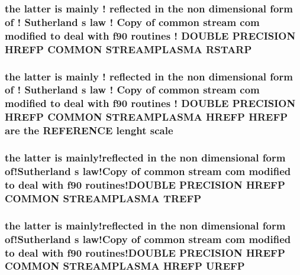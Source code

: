 \hypertarget{streamplasma_8com_adae9419de6845ee8a01c09d17e42e230}{
\subsubsection[{R\-S\-T\-A\-R\-P}]{\setlength{\rightskip}{0pt plus 5cm}the latter is mainly ! reflected in the non dimensional form of ! Sutherland s law ! Copy of common stream com modified to deal with f90 routines ! D\-O\-U\-B\-L\-E P\-R\-E\-C\-I\-S\-I\-O\-N H\-R\-E\-F\-P C\-O\-M\-M\-O\-N S\-T\-R\-E\-A\-M\-P\-L\-A\-S\-M\-A R\-S\-T\-A\-R\-P}}\label{streamplasma_8com_adae9419de6845ee8a01c09d17e42e230}
\hypertarget{streamplasma_8com_a9616e932993fe637ff56a4e7e73a4edd}{
\subsubsection[{scale}]{\setlength{\rightskip}{0pt plus 5cm}the latter is mainly ! reflected in the non dimensional form of ! Sutherland s law ! Copy of common stream com modified to deal with f90 routines ! D\-O\-U\-B\-L\-E P\-R\-E\-C\-I\-S\-I\-O\-N H\-R\-E\-F\-P C\-O\-M\-M\-O\-N S\-T\-R\-E\-A\-M\-P\-L\-A\-S\-M\-A H\-R\-E\-F\-P H\-R\-E\-F\-P {\bf are} the R\-E\-F\-E\-R\-E\-N\-C\-E lenght scale}}\label{streamplasma_8com_a9616e932993fe637ff56a4e7e73a4edd}
\hypertarget{streamplasma_8com_a8eec3465503eea308bd475421a829fb7}{
\subsubsection[{T\-R\-E\-F\-P}]{\setlength{\rightskip}{0pt plus 5cm}the latter is mainly!reflected in the non dimensional form of!\-Sutherland s law!\-Copy of common stream com modified to deal with f90 routines!\-D\-O\-U\-B\-L\-E P\-R\-E\-C\-I\-S\-I\-O\-N H\-R\-E\-F\-P C\-O\-M\-M\-O\-N S\-T\-R\-E\-A\-M\-P\-L\-A\-S\-M\-A T\-R\-E\-F\-P}}\label{streamplasma_8com_a8eec3465503eea308bd475421a829fb7}
\hypertarget{streamplasma_8com_aefb5084f5d13055365d34bc8560753b3}{
\subsubsection[{U\-R\-E\-F\-P}]{\setlength{\rightskip}{0pt plus 5cm}the latter is mainly!reflected in the non dimensional form of!\-Sutherland s law!\-Copy of common stream com modified to deal with f90 routines!\-D\-O\-U\-B\-L\-E P\-R\-E\-C\-I\-S\-I\-O\-N H\-R\-E\-F\-P C\-O\-M\-M\-O\-N S\-T\-R\-E\-A\-M\-P\-L\-A\-S\-M\-A H\-R\-E\-F\-P U\-R\-E\-F\-P}}\label{streamplasma_8com_aefb5084f5d13055365d34bc8560753b3}
